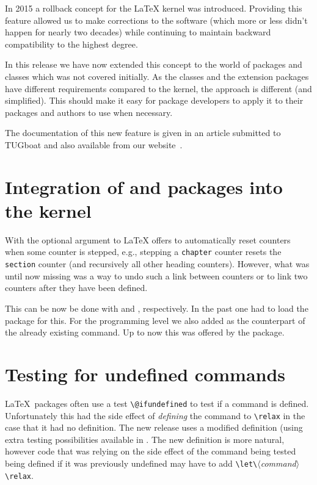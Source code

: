 \documentclass{ltnews}
\providecommand\meta[1]{$\langle$\textit{#1}$\rangle$}
\begin{document}
  In 2015 a rollback concept for the \LaTeX{} kernel was introduced.
  Providing this feature allowed us to make corrections to the
  software (which more or less didn't happen for nearly two decades)
  while continuing to maintain backward compatibility to the highest
  degree.
  
  In this release we have now extended this concept to
  the world of packages and classes which was not covered
  initially. As the classes and the extension packages have different
  requirements compared to the kernel, the approach is different (and
  simplified). This should make it easy for package developers to
  apply it to their packages and authors to use when necessary.

  The documentation of this new feature is given in an article
  submitted to TUGboat and also available from our
  website~\cite{Mittelbach:TB39-2}.


\section[Integration of \pkg{remreset} and \pkg{chngcntr} packages]
         {Integration of  and  packages 
         into the kernel}

With the optional argument to  \LaTeX{} offers to
automatically reset counters when some counter is stepped, e.g.,
stepping a \texttt{chapter} counter resets the \texttt{section}
counter (and recursively all other heading counters). However, what
was until now missing was a way to undo such a link between counters
or to link two counters after they have been defined.

This can be now be done with  and ,
respectively. In the past one had to load the  package
for this. For the programming level we also added
 as the counterpart of the already existing
 command. Up to now this was offered by the
 package.

\section{Testing for undefined commands}
\LaTeX\ packages often use a test \verb|\@ifundefined| to test if a command
is defined. Unfortunately this had the side effect of \emph{defining}
the command to \verb|\relax| in the case that it had no definition.
 The new release uses a modified definition
(using extra testing possibilities available in . The new definition
is more natural, however code that was relying on the side effect of the
command being tested being defined if it was previously undefined may have to add
\verb|\let\|\meta{command}\verb|\relax|.
\end{document}
